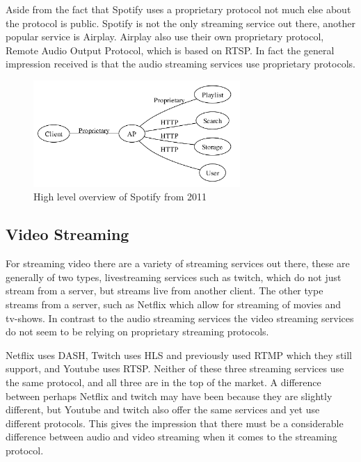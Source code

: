 Aside from the fact that Spotify uses a proprietary protocol not much else about the protocol is public.
Spotify is not the only streaming service out there, another popular service is Airplay.
Airplay also use their own proprietary protocol, Remote Audio Output Protocol, which is based on \acl{RTSP}.
In fact the general impression received is that the audio streaming services use proprietary protocols.

\begin{figure}[h!]
    \centering
    \includegraphics[width=0.7\textwidth]{img/spotifyOverview.png}
    \caption{High level overview of Spotify from 2011 \cite{spotifySlides}}
    \label{fig:spotifyOverview}
\end{figure}


\subsection{Video Streaming}
For streaming video there are a variety of streaming services out there, these are generally of two types, livestreaming services such as twitch, which do not just stream from a server, but streams live from another client.
The other type streams from a server, such as Netflix which allow for streaming of movies and tv-shows.
In contrast to the audio streaming services the video streaming services do not seem to be relying on proprietary streaming protocols.

Netflix uses \acl{DASH}, Twitch uses \acl{HLS} and previously used \acl{RTMP} which they still support, and Youtube uses \acl{RTSP}.\cite{netflix}\cite{twitch}\cite{youtube}
Neither of these three streaming services use the same protocol, and all three are in the top of the market.
A difference between perhaps Netflix and twitch may have been because they are slightly different, but Youtube and twitch also offer the same services and yet use different protocols.
This gives the impression that there must be a considerable difference between audio and video streaming when it comes to the streaming protocol.

